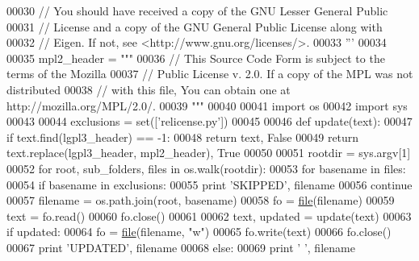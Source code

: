 \begin{DoxyCode}
00030 \textcolor{stringliteral}{// You should have received a copy of the GNU Lesser General Public}
00031 \textcolor{stringliteral}{// License and a copy of the GNU General Public License along with}
00032 \textcolor{stringliteral}{// Eigen. If not, see <http://www.gnu.org/licenses/>.}
00033 \textcolor{stringliteral}{'''}
00034 
00035 mpl2\_header = \textcolor{stringliteral}{"""}
00036 \textcolor{stringliteral}{// This Source Code Form is subject to the terms of the Mozilla}
00037 \textcolor{stringliteral}{// Public License v. 2.0. If a copy of the MPL was not distributed}
00038 \textcolor{stringliteral}{// with this file, You can obtain one at http://mozilla.org/MPL/2.0/.}
00039 \textcolor{stringliteral}{"""}
00040 
00041 \textcolor{keyword}{import} os
00042 \textcolor{keyword}{import} sys
00043 
00044 exclusions = set([\textcolor{stringliteral}{'relicense.py'}])
00045 
00046 \textcolor{keyword}{def }update(text):
00047   \textcolor{keywordflow}{if} text.find(lgpl3\_header) == -1:
00048     \textcolor{keywordflow}{return} text, \textcolor{keyword}{False}
00049   \textcolor{keywordflow}{return} text.replace(lgpl3\_header, mpl2\_header), \textcolor{keyword}{True}
00050 
00051 rootdir = sys.argv[1]
00052 \textcolor{keywordflow}{for} root, sub\_folders, files \textcolor{keywordflow}{in} os.walk(rootdir):
00053     \textcolor{keywordflow}{for} basename \textcolor{keywordflow}{in} files:
00054         \textcolor{keywordflow}{if} basename \textcolor{keywordflow}{in} exclusions:
00055           \textcolor{keywordflow}{print} \textcolor{stringliteral}{'SKIPPED'}, filename
00056           \textcolor{keywordflow}{continue}
00057         filename = os.path.join(root, basename)
00058         fo = \hyperlink{structfile}{file}(filename)
00059         text = fo.read()
00060         fo.close()
00061 
00062         text, updated = update(text)
00063         \textcolor{keywordflow}{if} updated:
00064           fo = \hyperlink{structfile}{file}(filename, \textcolor{stringliteral}{"w"})
00065           fo.write(text)
00066           fo.close()
00067           \textcolor{keywordflow}{print} \textcolor{stringliteral}{'UPDATED'}, filename
00068         \textcolor{keywordflow}{else}:
00069           \textcolor{keywordflow}{print} \textcolor{stringliteral}{'       '}, filename
\end{DoxyCode}
